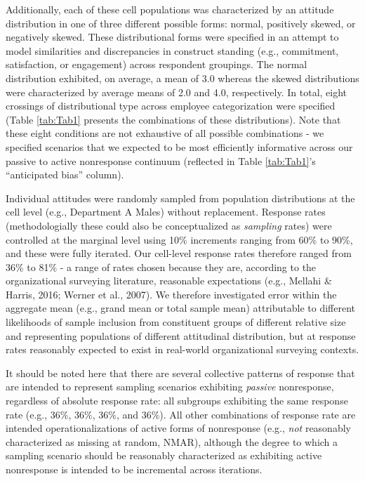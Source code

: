 \documentclass[
  man,mask]{apa7}
\begin{document}
Additionally, each of these cell populations was characterized by an attitude distribution in one of three different possible forms: normal, positively skewed, or negatively skewed. These distributional forms were specified in an attempt to model similarities and discrepancies in construct standing (e.g., commitment, satisfaction, or engagement) across respondent groupings. The normal distribution exhibited, on average, a mean of 3.0 whereas the skewed distributions were characterized by average means of 2.0 and 4.0, respectively. In total, eight crossings of distributional type across employee categorization were specified (Table \ref{tab:Tab1} presents the combinations of these distributions). Note that these eight conditions are not exhaustive of all possible combinations - we specified scenarios that we expected to be most efficiently informative across our passive to active nonresponse continuum (reflected in Table \ref{tab:Tab1}'s ``anticipated bias'' column).

Individual attitudes were randomly sampled from population distributions at the cell level (e.g., Department A Males) without replacement. Response rates (methodologially these could also be conceptualized as \emph{sampling} rates) were controlled at the marginal level using 10\% increments ranging from 60\% to 90\%, and these were fully iterated. Our cell-level response rates therefore ranged from 36\% to 81\% - a range of rates chosen because they are, according to the organizational surveying literature, reasonable expectations (e.g., Mellahi \& Harris, 2016; Werner et al., 2007). We therefore investigated error within the aggregate mean (e.g., grand mean or total sample mean) attributable to different likelihoods of sample inclusion from constituent groups of different relative size and representing populations of different attitudinal distribution, but at response rates reasonably expected to exist in real-world organizational surveying contexts.

It should be noted here that there are several collective patterns of response that are intended to represent sampling scenarios exhibiting \emph{passive} nonresponse, regardless of absolute response rate: all subgroups exhibiting the same response rate (e.g., 36\%, 36\%, 36\%, and 36\%). All other combinations of response rate are intended operationalizations of active forms of nonresponse (e.g., \emph{not} reasonably characterized as missing at random, NMAR), although the degree to which a sampling scenario should be reasonably characterized as exhibiting active nonresponse is intended to be incremental across iterations.
\end{document}
